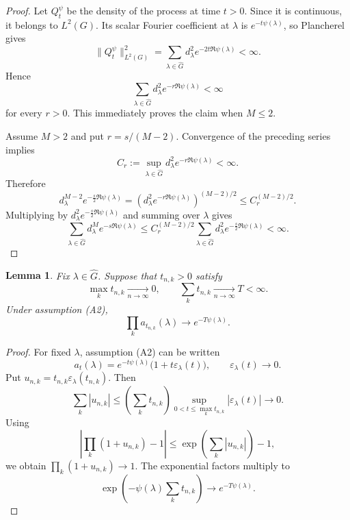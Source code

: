 \documentclass[11pt,a4paper,reqno]{article}
\newtheorem{lemma}[theorem]{Lemma}
\theoremstyle{definition}
\theoremstyle{remark}
\begin{document}
\begin{proof}
Let $Q_t^\psi$ be the density of the process at time $t>0$. Since it is continuous, it belongs to $L^2(G)$. Its scalar Fourier coefficient at $\lambda$ is $e^{-t\psi(\lambda)}$, so Plancherel gives
\[
 \|Q_t^\psi\|_{L^2(G)}^2
 =
 \sum_{\lambda\in\widehat G}
 d_\lambda^2 e^{-2t\Re\psi(\lambda)}<\infty.
\]
Hence
\[
 \sum_{\lambda\in\widehat G}d_\lambda^2e^{-r\Re\psi(\lambda)}<\infty
\]
for every $r>0$. This immediately proves the claim when $M\leq2$.

Assume $M>2$ and put $r=s/(M-2)$. Convergence of the preceding series implies
\[
 C_r:=\sup_{\lambda\in\widehat G}
 d_\lambda^2e^{-r\Re\psi(\lambda)}<\infty.
\]
Therefore
\[
 d_\lambda^{M-2}e^{-\frac{s}{2}\Re\psi(\lambda)}
 =
 \left(d_\lambda^2e^{-r\Re\psi(\lambda)}\right)^{(M-2)/2}
 \leq C_r^{(M-2)/2}.
\]
Multiplying by $d_\lambda^2e^{-\frac{s}{2}\Re\psi(\lambda)}$ and summing over $\lambda$ gives
\[
 \sum_{\lambda\in\widehat G}d_\lambda^M e^{-s\Re\psi(\lambda)}
 \leq
 C_r^{(M-2)/2}
 \sum_{\lambda\in\widehat G}d_\lambda^2e^{-\frac{s}{2}\Re\psi(\lambda)}<\infty.
\]
\end{proof}
\begin{lemma}\label{lem:triangular-products}
Fix $\lambda\in\widehat G$. Suppose that $t_{n,k}>0$ satisfy
\[
 \max_k t_{n,k}\xrightarrow[n\to\infty]{}0,
 \qquad
 \sum_k t_{n,k}\xrightarrow[n\to\infty]{} T<\infty.
\]
Under assumption (A2),
\[
 \prod_k a_{t_{n,k}}(\lambda)
 \longrightarrow
 e^{-T\psi(\lambda)}.
\]
\end{lemma}

\begin{proof}
For fixed $\lambda$, assumption (A2) can be written
\[
 a_t(\lambda)
 =
 e^{-t\psi(\lambda)}\bigl(1+t\varepsilon_\lambda(t)\bigr),
 \qquad
 \varepsilon_\lambda(t)\longrightarrow0.
\]
Put $u_{n,k}=t_{n,k}\varepsilon_\lambda(t_{n,k})$. Then
\[
 \sum_k|u_{n,k}|
 \le
 \left(\sum_k t_{n,k}\right)
 \sup_{0<t\le\max_k t_{n,k}}|\varepsilon_\lambda(t)|
 \longrightarrow0.
\]
Using
\[
 \left|\prod_k(1+u_{n,k})-1\right|
 \le
 \exp\left(\sum_k|u_{n,k}|\right)-1,
\]
we obtain $\prod_k(1+u_{n,k})\to1$. The exponential factors multiply to
\[
 \exp\left(-\psi(\lambda)\sum_k t_{n,k}\right)
 \longrightarrow e^{-T\psi(\lambda)}.
\]
\end{proof}
\end{document}
